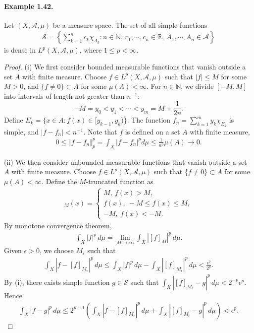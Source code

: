 \documentclass{article}
\begin{document}
\paragraph{Example 1.42.\label{example:1.42}} Let $(X,\mathscr{A},\mu)$ be a measure space. The set of all simple functions
\begin{align*}
	\mathcal{S} = \left\{\sum_{k=1}^n c_k\chi_{A_k}:n\in\mathbb{N},\ c_1,\cdots,c_n\in\mathbb{R},\ A_1,\cdots,A_n\in\mathscr{A}\right\}
\end{align*}
is dense in $L^p(X,\mathscr{A},\mu)$, where $1\leq p < \infty$.
\begin{proof}
(i) We first consider bounded measurable functions that vanish outside a set $A$ with finite measure. Choose $f\in L^p(X,\mathscr{A},\mu)$ such that $\vert f\vert \leq M$ for some $M>0$, and $\{f\neq 0\}\subset A$ for some $\mu(A)<\infty$. For $n\in\mathbb{N}$, we divide $[-M,M]$ into intervals of length not greater than $n^{-1}$:
$$-M = y_0 < y_1 < \cdots < y_m = M+\frac{1}{2n}.$$
Define $E_k=\{x\in A:f(x)\in[y_{k-1},y_k)\}$. The function $f_n = \sum_{k=1}^m y_k\chi_{E_k}$ is simple, and $\vert f-f_n\vert < n^{-1}$. Note that $f$ is defined on a set $A$ with finite measure,
\begin{align*}
	0\leq \Vert f-f_n\Vert_p^p = \int_X\vert f - f_n\vert^p d\mu \leq \frac{1}{n^p}\mu(A)\to 0.
\end{align*}

(ii) We then consider unbounded measurable functions that vanish outside a set $A$ with finite measure. Choose $f\in L^p(X,\mathscr{A},\mu)$ such that $\{f\neq 0\}\subset A$ for some $\mu(A)<\infty$. Define the $M$-truncated function as
\begin{align*}
	[f]_M(x) = \begin{cases}
		M,\ f(x) > M,\\
		f(x),\ -M\leq f(x)\leq M,\\
		-M,\ f(x)<-M.
	\end{cases}
\end{align*}
By monotone convergence theorem,  
\begin{align*}
	\int_X \vert f\vert^p\,d\mu = \lim_{M\to\infty}\int_X\left\vert[f]_M\right\vert^p\,d\mu.
\end{align*}
Given $\epsilon > 0$, we choose $M_\epsilon$ such that 
\begin{align*}
	\int_X\left\vert f - [f]_{M_\epsilon}\right\vert^p\,d\mu \leq \int_X\vert f\vert^p\,d\mu - \int_X\left\vert[f]_{M_\epsilon}\right\vert^p\,d\mu < \frac{\epsilon^p}{2^p}.
\end{align*}
By (i), there exists simple function $g\in \mathcal{S}$ such that $\int_X\left\vert [f]_{M_\epsilon} - g\right\vert^p\,d\mu < 2^{-p}\epsilon^p$. Hence
\begin{align*}
	\int_X\left\vert f-g\right\vert^p\,d\mu \leq 2^{p-1}\left(\int_X\left\vert f-[f]_{M_\epsilon}\right\vert^p\,d\mu + \int_X\left\vert [f]_{M_\epsilon}-g\right\vert^p\,d\mu\right) < \epsilon^p.
\end{align*}


\end{proof}
\end{document}
